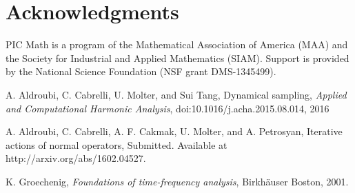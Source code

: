 \documentclass[12pt]{report}
\begin{document}
\newpage
\section{Acknowledgments}

 PIC Math is a program of the Mathematical Association of America (MAA) and the Society for Industrial and Applied Mathematics (SIAM). Support is provided by the National Science Foundation (NSF grant DMS-1345499).
\newpage
 
\begin{thebibliography}{111}
   
A. Aldroubi, C. Cabrelli, U. Molter, and Sui Tang,
Dynamical sampling, 
{\it  Applied and Computational Harmonic Analysis}, doi:10.1016/j.acha.2015.08.014, 2016

{}
    A. Aldroubi, C. Cabrelli, A. F. Cakmak, U. Molter,  and A. Petrosyan,
    Iterative actions of normal operators, 
    Submitted. Available at http://arxiv.org/abs/1602.04527.
  
    K. Groechenig,
    {\it Foundations of time-frequency analysis}, 
    Birkh\"auser Boston, 2001.

\end{thebibliography}
\end{document}
